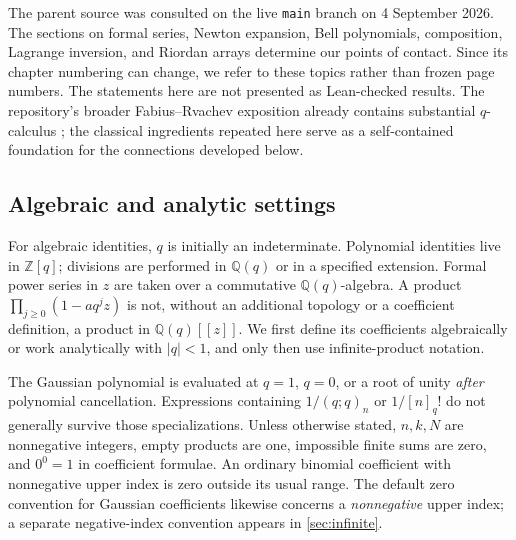 \documentclass[11pt,a4paper]{article}
\numberwithin{equation}{section}
\theoremstyle{definition}
\theoremstyle{remark}
\newcommand{\Z}{\mathbb Z}
\newcommand{\Q}{\mathbb Q}
\newcommand{\qfac}[1]{[#1]_q!}
\begin{document}
The parent source was consulted on the live \texttt{main} branch on
4 September 2026. The sections on formal series, Newton expansion, Bell
polynomials, composition, Lagrange inversion, and Riordan arrays determine
our points of contact. Since its chapter numbering can change, we refer to
these topics rather than frozen page numbers. The statements here are not presented as Lean-checked results. The repository's broader
Fabius--Rvachev exposition already contains substantial $q$-calculus
\cite{fabiusrepo}; the classical ingredients repeated here serve as a
self-contained foundation for the connections developed below.

\subsection{Algebraic and analytic settings}
For algebraic identities, $q$ is initially an indeterminate. Polynomial
identities live in $\Z[q]$; divisions are performed in $\Q(q)$ or in a
specified extension. Formal power series in $z$ are taken over a
commutative $\Q(q)$-algebra. A product $\prod_{j\ge0}(1-aq^jz)$ is not,
without an additional topology or a coefficient definition, a product in
$\Q(q)[[z]]$. We first define its coefficients algebraically or work
analytically with $|q|<1$, and only then use infinite-product notation.

The Gaussian polynomial is evaluated at $q=1$, $q=0$, or a root of unity
\emph{after} polynomial cancellation. Expressions containing
$1/(q;q)_n$ or $1/\qfac n$ do not generally survive those specializations.
Unless otherwise stated, $n,k,N$ are nonnegative integers, empty products
are one, impossible finite sums are zero, and $0^0=1$ in coefficient
formulae. An ordinary binomial coefficient with nonnegative upper index is
zero outside its usual range. The default zero convention for Gaussian
coefficients likewise concerns a \emph{nonnegative} upper index; a separate
negative-index convention appears in \cref{sec:infinite}.
\end{document}
